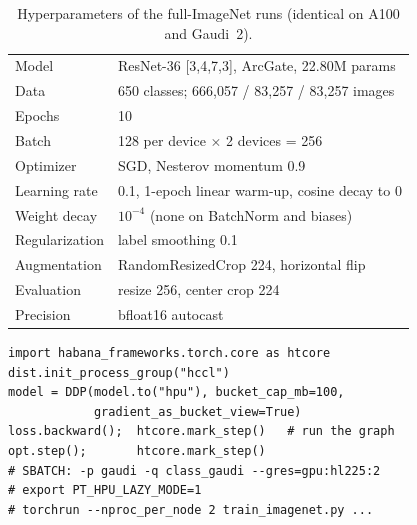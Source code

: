 \documentclass[10pt,twocolumn,letterpaper]{article}
\begin{document}
\begin{table}[t]
\centering\footnotesize\setlength{\tabcolsep}{4pt}
\begin{tabular}{@{}ll@{}}
\toprule
Model & ResNet-36 [3,4,7,3], ArcGate, 22.80M params \\
Data & 650 classes; 666{,}057 / 83{,}257 / 83{,}257 images \\
Epochs & 10 \\
Batch & 128 per device $\times$ 2 devices = 256 \\
Optimizer & SGD, Nesterov momentum 0.9 \\
Learning rate & 0.1, 1-epoch linear warm-up, cosine decay to 0 \\
Weight decay & $10^{-4}$ (none on BatchNorm and biases) \\
Regularization & label smoothing 0.1 \\
Augmentation & RandomResizedCrop 224, horizontal flip \\
Evaluation & resize 256, center crop 224 \\
Precision & bfloat16 autocast \\
\bottomrule
\end{tabular}
\caption{Hyperparameters of the full-ImageNet runs (identical on A100 and Gaudi~2).}
\label{tab:hparams}
\end{table}

\begin{lstlisting}[float=tbp,caption={Gaudi-specific parts of the training loop and job script (excerpt).},label={lst:gaudi}]
import habana_frameworks.torch.core as htcore
dist.init_process_group("hccl")
model = DDP(model.to("hpu"), bucket_cap_mb=100,
            gradient_as_bucket_view=True)
loss.backward();  htcore.mark_step()   # run the graph
opt.step();       htcore.mark_step()
# SBATCH: -p gaudi -q class_gaudi --gres=gpu:hl225:2
# export PT_HPU_LAZY_MODE=1
# torchrun --nproc_per_node 2 train_imagenet.py ...
\end{lstlisting}
\end{document}
